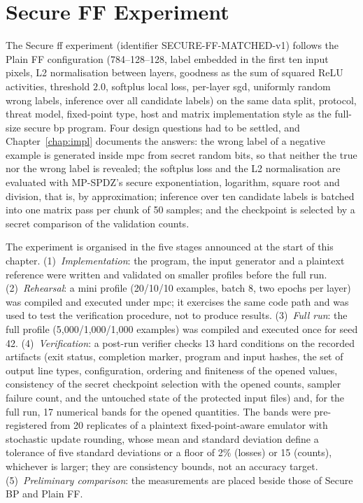 \section{Secure FF Experiment}\label{sec:method-sff}
The Secure \ac{ff} experiment (identifier SECURE-FF-MATCHED-v1) follows the Plain FF configuration (784--128--128, label embedded in the first ten input pixels, L2 normalisation between layers, goodness as the sum of squared ReLU activities, threshold $2.0$, softplus local loss, per-layer \ac{sgd}, uniformly random wrong labels, inference over all candidate labels) on the same data split, protocol, threat model, fixed-point type, host and matrix implementation style as the full-size secure \ac{bp} program. Four design questions had to be settled, and Chapter~\ref{chap:impl} documents the answers: the wrong label of a negative example is generated inside \ac{mpc} from secret random bits, so that neither the true nor the wrong label is revealed; the softplus loss and the L2 normalisation are evaluated with MP-SPDZ's secure exponentiation, logarithm, square root and division, that is, by approximation; inference over ten candidate labels is batched into one matrix pass per chunk of 50 samples; and the checkpoint is selected by a secret comparison of the validation counts.

The experiment is organised in the five stages announced at the start of this chapter. (1)~\emph{Implementation}: the program, the input generator and a plaintext reference were written and validated on smaller profiles before the full run. (2)~\emph{Rehearsal}: a mini profile (20/10/10 examples, batch 8, two epochs per layer) was compiled and executed under \ac{mpc}; it exercises the same code path and was used to test the verification procedure, not to produce results. (3)~\emph{Full run}: the full profile (5{,}000/1{,}000/1{,}000 examples) was compiled and executed once for seed 42. (4)~\emph{Verification}: a post-run verifier checks 13 hard conditions on the recorded artifacts (exit status, completion marker, program and input hashes, the set of output line types, configuration, ordering and finiteness of the opened values, consistency of the secret checkpoint selection with the opened counts, sampler failure count, and the untouched state of the protected input files) and, for the full run, 17 numerical bands for the opened quantities. The bands were pre-registered from 20 replicates of a plaintext fixed-point-aware emulator with stochastic update rounding, whose mean and standard deviation define a tolerance of five standard deviations or a floor of 2\% (losses) or 15 (counts), whichever is larger; they are consistency bounds, not an accuracy target. (5)~\emph{Preliminary comparison}: the measurements are placed beside those of Secure BP and Plain FF.

